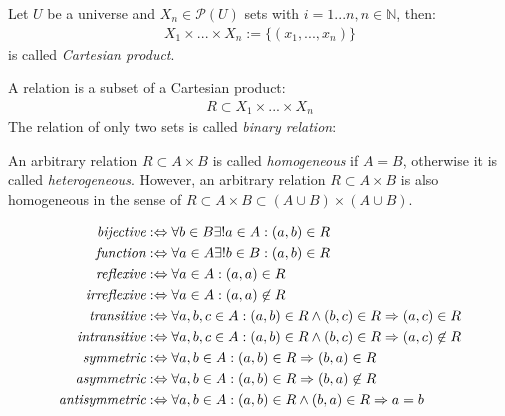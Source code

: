 \begin{definition}
Let $U$ be a universe and $X_n \in \mathcal{P}(U)$ sets with $ i=1...n, n \in \mathbb{N}$, then:
\begin{align}
X_1 \times ... \times X_n := \{ (x_1,..., x_n) \}
\end{align} 
is called \emph{Cartesian product}.
\end{definition}

\begin{definition}[Relation]
A relation is a subset of a Cartesian product:
\begin{align}
R \subset X_1 \times ... \times X_n 
\end{align}
The relation of only two sets is called \emph{binary relation}:
\end{definition}
An arbitrary relation $R \subset A \times B$ is called \emph{homogeneous} if $A = B$, otherwise it is called \emph{heterogeneous}.
However, an arbitrary relation $R \subset A \times B$ is also homogeneous in the sense of
$R \subset A \times B \subset (A \cup B) \times (A \cup B)$.

\begin{definition}
\begin{align}
\emph{bijective} 
&:\Leftrightarrow
\forall b \in B \exists! a \in A: (a,b) \in R
\\
\emph{function} 
&:\Leftrightarrow
\forall a \in A \exists! b \in B: (a,b) \in R
\\
\emph{reflexive} 
&:\Leftrightarrow
\forall a \in A: (a,a) \in R
\\
\emph{irreflexive} 
&:\Leftrightarrow
\forall a \in A: (a,a) \not\in R
\\
\emph{transitive} 
&:\Leftrightarrow
\forall a,b,c \in A: (a,b) \in R \wedge (b,c) \in R \Rightarrow (a,c) \in R
\\
\emph{intransitive} 
&:\Leftrightarrow
\forall a,b,c \in A: (a,b) \in R \wedge (b,c) \in R \Rightarrow (a,c) \not\in R
\\
\emph{symmetric} 
&:\Leftrightarrow
\forall a,b \in A: (a,b) \in R \Rightarrow (b,a) \in R
\\
\emph{asymmetric} 
&:\Leftrightarrow
\forall a,b \in A: (a,b) \in R \Rightarrow (b,a) \not\in R
\\
\emph{antisymmetric} 
&:\Leftrightarrow
\forall a,b \in A: (a,b) \in R \wedge (b,a) \in R \Rightarrow a = b
\end{align}
\end{definition}

